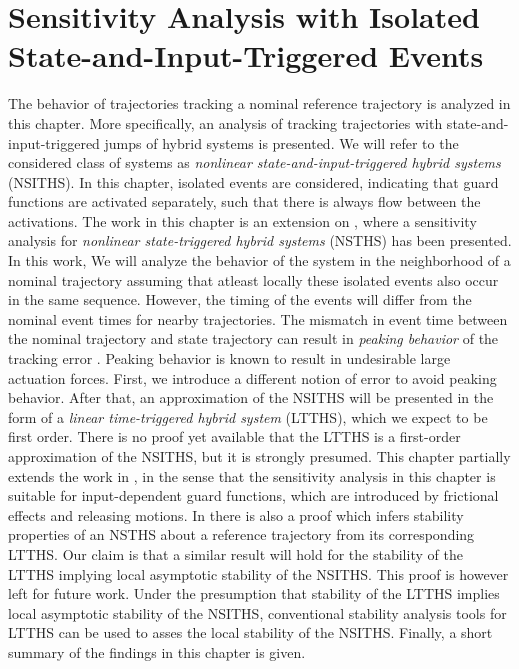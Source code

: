 \documentclass[../DC2019003Bouma.tex]{subfiles}
\begin{document}
\graphicspath{{03_Contribution/img/}}
\renewcommand{\chaptermark}[1]{\markboth{\thechapter.\ #1}{}}
\renewcommand{\sectionmark}[1]{\markright{#1}{}}

\pagestyle{fancyreport}
\cleartooddpage
\pagestyle{fancyreport}
\chapter{Sensitivity Analysis with Isolated State-and-Input-Triggered Events}\label{ch:order}
The behavior of trajectories tracking a nominal reference trajectory is analyzed in this chapter. More specifically, an analysis of tracking trajectories with state-and-input-triggered jumps of hybrid systems is presented. We will refer to the considered class of systems as \textit{nonlinear state-and-input-triggered hybrid systems} (NSITHS). In this chapter, isolated events are considered, indicating that guard functions are activated separately, such that there is always flow between the activations. The work in this chapter is an extension on \cite{Saccon2014,Rijnen2017,Rijnen2018a}, where a sensitivity analysis for \textit{nonlinear state-triggered hybrid systems} (NSTHS) has been presented. In this work, We will analyze the behavior of the system in the neighborhood of a nominal trajectory assuming that atleast locally these isolated events also occur in the same sequence. However, the timing of the events will differ from the nominal event times for nearby trajectories. The mismatch in event time between the nominal trajectory and state trajectory can result in \textit{peaking behavior} of the tracking error \cite{Menini2001,Biemond2013}. Peaking behavior is known to result in undesirable large actuation forces. First, we introduce a different notion of error to avoid peaking behavior. After that, an approximation of the NSITHS will be presented in the form of a \textit{linear time-triggered hybrid system} (LTTHS), which we expect to be first order. There is no proof yet available that the LTTHS is a first-order approximation of the NSITHS, but it is strongly presumed. This chapter partially extends the work in \cite{Rijnen2017}, in the sense that the sensitivity analysis in this chapter is suitable for input-dependent guard functions, which are introduced by frictional effects and releasing motions. In \cite{Rijnen2017} there is also a proof which infers stability properties of an NSTHS about a reference trajectory from its corresponding LTTHS. Our claim is that a similar result will hold for the stability of the LTTHS implying local asymptotic stability of the NSITHS. This proof is however left for future work. Under the presumption that stability of the LTTHS implies local asymptotic stability of the NSITHS, conventional stability analysis tools for LTTHS can be used to asses the local stability of the NSITHS. Finally, a short summary of the findings in this chapter is given.
%
%
\end{document}

